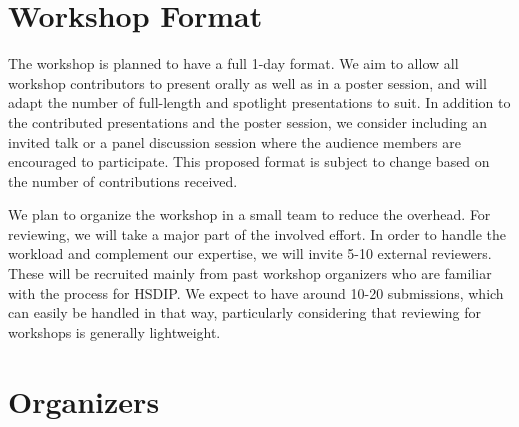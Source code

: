 \documentclass[10pt]{article}
\begin{document}
\section*{Workshop Format}

The workshop is planned to have a full 1-day format.  We aim to allow all
workshop contributors to present orally as well as in a poster session,
and will adapt the number of full-length and spotlight presentations to suit.
In addition to the contributed presentations and the poster session,
we consider including an invited talk or a panel
discussion session where the audience members are encouraged to participate.
This proposed format is subject to change based on the number of contributions received.

We plan to organize the workshop in a small team to reduce the overhead. For
reviewing, we will take a major part of the involved effort. In order to handle
the workload and complement our expertise, we will invite 5-10 external
reviewers. These will be recruited mainly from past workshop organizers who are
familiar with the process for HSDIP. We expect to have around 10-20 submissions, which can
easily be handled in that way, particularly considering that reviewing for
workshops is generally lightweight.


\section*{Organizers}
\end{document}
